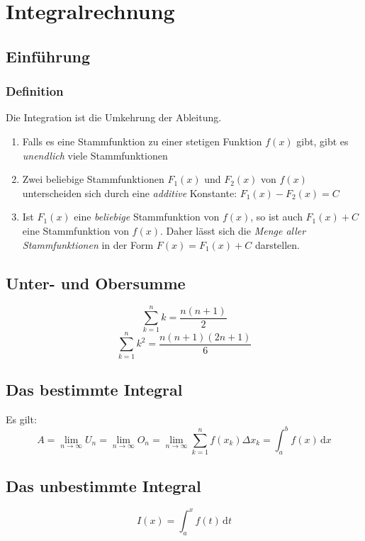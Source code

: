 \documentclass[a4paper,DIV10,12pt,headsepline,smallheadings,halfparskip-]{scrreprt}
\begin{document}
	\chapter{Integralrechnung}
	\section{Einführung} %
	\label{sec:einführung}
	\subsection{Definition} %
	\label{sub:definition}
	Die Integration ist die Umkehrung der Ableitung.
	\label{sub:stammfunktion}
	\begin{enumerate}
		\item Falls es eine Stammfunktion zu einer stetigen Funktion \(f(x)\) gibt, gibt es \emph{unendlich} viele Stammfunktionen
		\item Zwei beliebige Stammfunktionen \(F_1 (x)\) und \(F_2 (x)\) von \(f(x)\) unterscheiden sich durch eine \emph{additive} Konstante: \(F_1 (x) - F_2 (x) = C\)
		\item Ist \(F_1 (x)\) eine \emph{beliebige} Stammfunktion von \(f (x)\), so ist auch \(F_1 (x) + C\) eine Stammfunktion von \(f (x)\). Daher lässt sich die \emph{Menge aller Stammfunktionen} in der Form \(F(x) = F_1 (x) + C \) darstellen.
	\end{enumerate}
	\section{Unter- und Obersumme}
	\[ \sum_{k=1}^{n} k = \frac{n(n+1)}{2} \]
	\[ \sum_{k=1}^{n} k^2 = \frac{n(n+1)(2n+1)}{6} \]

	\section{Das bestimmte Integral} %
	\label{sub:das_bestimmte_integral}
	Es gilt:\newline
	\[A = \lim\limits_{n \rightarrow \infty}U_n = \lim\limits_{n \rightarrow \infty}O_n = \lim\limits_{n \rightarrow \infty}\sum_{k=1}^{n} f(x_k) \Delta x_k = \int_a^b f(x)\,\mathrm{d}x \]

	\section{Das unbestimmte Integral} %
	\label{sec:das_unbestimmte_integral}
	\[ I(x) = \int_a^x f(t)\,\mathrm{d}t \]
\end{document}
